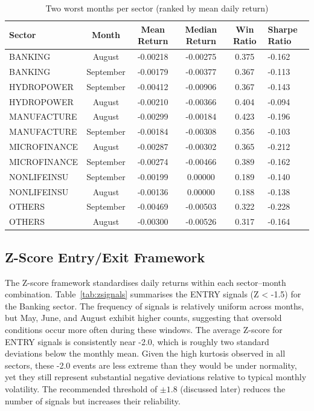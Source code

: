 \documentclass[12pt,a4paper,fleqn]{article}
\begin{document}
\begin{table}[ht]
\centering
\caption{Two worst months per sector (ranked by mean daily return)}
\label{tab:worstmonths}
\begin{tabular}{lcccc}
\toprule
Sector & Month & Mean Return & Median Return & Win Ratio & Sharpe Ratio \\
\midrule
BANKING       & August    & -0.00218 & -0.00275 & 0.375 & -0.162 \\
BANKING       & September & -0.00179 & -0.00377 & 0.367 & -0.113 \\
\addlinespace
HYDROPOWER    & September & -0.00412 & -0.00906 & 0.367 & -0.143 \\
HYDROPOWER    & August    & -0.00210 & -0.00366 & 0.404 & -0.094 \\
\addlinespace
MANUFACTURE   & August    & -0.00299 & -0.00184 & 0.423 & -0.196 \\
MANUFACTURE   & September & -0.00184 & -0.00308 & 0.356 & -0.103 \\
\addlinespace
MICROFINANCE  & August    & -0.00287 & -0.00302 & 0.365 & -0.212 \\
MICROFINANCE  & September & -0.00274 & -0.00466 & 0.389 & -0.162 \\
\addlinespace
NONLIFEINSU   & September & -0.00199 & 0.00000 & 0.189 & -0.140 \\
NONLIFEINSU   & August    & -0.00136 & 0.00000 & 0.188 & -0.138 \\
\addlinespace
OTHERS        & September & -0.00469 & -0.00503 & 0.322 & -0.228 \\
OTHERS        & August    & -0.00300 & -0.00526 & 0.317 & -0.164 \\
\bottomrule
\end{tabular}
\end{table}

\subsection{Z-Score Entry/Exit Framework}

The Z-score framework standardises daily returns within each sector–month combination. Table~\ref{tab:zsignals} summarises the ENTRY signals (Z < -1.5) for the Banking sector. The frequency of signals is relatively uniform across months, but May, June, and August exhibit higher counts, suggesting that oversold conditions occur more often during these windows. The average Z-score for ENTRY signals is consistently near -2.0, which is roughly two standard deviations below the monthly mean. Given the high kurtosis observed in all sectors, these -2.0 events are less extreme than they would be under normality, yet they still represent substantial negative deviations relative to typical monthly volatility. The recommended threshold of \(\pm 1.8\) (discussed later) reduces the number of signals but increases their reliability.
\end{document}
